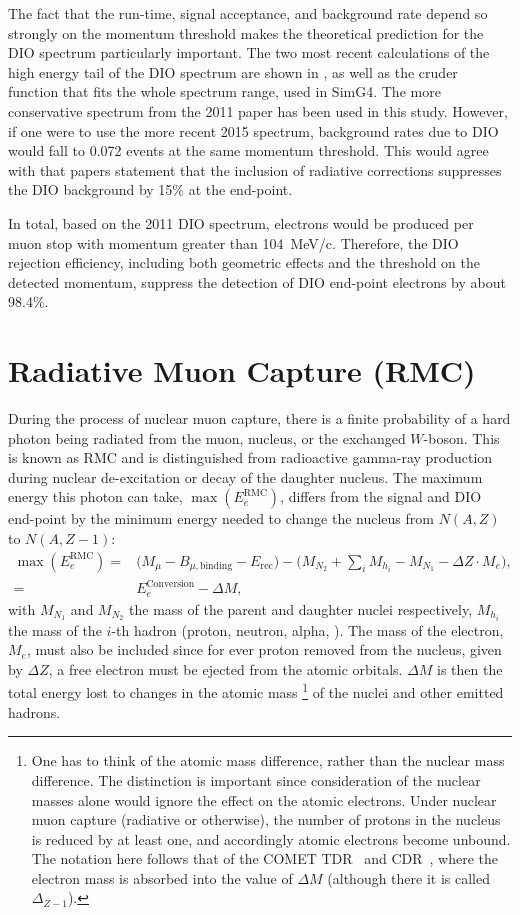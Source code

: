 \FigDIOEndPointComparison
The fact that the run-time, signal acceptance, and background rate depend so strongly on the momentum threshold makes the theoretical prediction for the \ac{DIO} spectrum particularly important.
The two most recent calculations of the high energy tail of the DIO spectrum are shown in , as well as the cruder function that fits the whole spectrum range, used in SimG4.
The more conservative spectrum from the 2011 paper has been used in this study.
However, if one were to use the more recent 2015 spectrum, background rates due to DIO would fall to 0.072 events at the same momentum threshold.
This would agree with that papers statement that the inclusion of radiative corrections suppresses the DIO background by 15\% at the end-point.

In total, based on the 2011 DIO spectrum,  electrons would be produced per muon stop with momentum greater than 104~MeV/c.
Therefore, the DIO rejection efficiency, including both geometric effects and the threshold on the detected momentum, suppress the detection of DIO end-point electrons by about 98.4\%.

\section{Radiative Muon Capture (\acs{RMC})}
During the process of nuclear muon capture, there is a finite probability of a hard photon being radiated from the muon, nucleus, or the exchanged $W$-boson.
This is known as \acf{RMC} and is distinguished from radioactive gamma-ray production during nuclear de-excitation or decay of the daughter nucleus.
The maximum energy this photon can take, $\max(E_e^\textrm{RMC})$, differs from the \mueconv signal and \ac{DIO} end-point by the minimum energy needed to change the nucleus from $N(A,Z)$ to $N(A,Z-1)$:
\begin{align}
\max(E_e^\textrm{RMC})=&\big(M_\mu - B_{\mu,\textrm{binding}} - E_\textrm{rec}\big)-\big(M_{N_2}+\sum_iM_{h_i}-M_{N_1}-\Delta{}Z\cdot{}M_e\big),\\
                      =&E^\textrm{Conversion}_e  - \Delta{}M,
\end{align}
with $M_{N_1}$ and $M_{N_2}$ the mass of the parent and daughter nuclei respectively, $M_{h_i}$ the mass of the $i$-th hadron (proton, neutron, alpha, \etc).
The mass of the electron, $M_e$, must also be included since for ever proton removed from the nucleus, given by $\Delta{}Z$, a free electron must be ejected from the atomic orbitals.
$\Delta{}M$ is then the total energy lost to changes in the atomic mass%
\footnote{
One has to think of the atomic mass difference, rather than the nuclear mass difference.
The distinction is important since consideration of the nuclear masses alone would ignore the effect on the atomic electrons.
Under nuclear muon capture (radiative or otherwise), the number of protons in the nucleus is reduced by at least one, and accordingly atomic electrons become unbound.
The notation here follows that of the COMET TDR~\cite{TDR2016} and CDR~\cite{CDRphase2}, where the electron mass is absorbed into the value of $\Delta{}M$ (although there it is called $\Delta_{Z-1}$).
}
of the nuclei and other emitted hadrons.
\FigRMCExperiments

